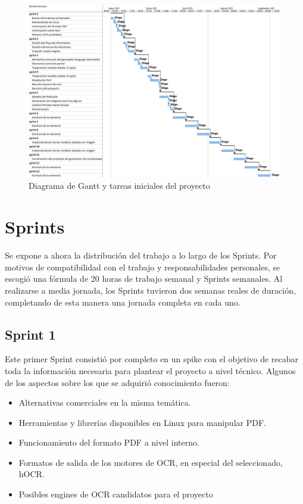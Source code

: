 \begin{figure}[hp!]
    \centering
    \includegraphics[angle=90,width=1.0\textwidth]{imaxes/f-planificacion/gantt-inicial.png}
    \caption{Diagrama de Gantt y tareas iniciales del proyecto}
    \label{fig:gantt-inicial}
\end{figure}

\section{Sprints}

Se expone a ahora la distribución del trabajo a lo largo de los Sprints. Por motivos de compatibilidad con el trabajo y responsabilidades personales, se escogió una fórmula de 20 horas de trabajo semanal y Sprints semanales. Al realizarse a media jornada, los Sprints tuvieron dos semanas reales de duración, completando de esta manera una jornada completa en cada uno.

\subsection{Sprint 1}

Este primer Sprint consistió por completo en un spike con el objetivo de recabar toda la información necesaria para plantear el proyecto a nivel técnico. Algunos de los aspectos sobre los que se adquirió conocimiento fueron:

\begin{itemize}
    \item Alternativas comerciales en la misma temática.
    \item Herramientas y librerías disponibles en Linux para manipular PDF.
    \item Funcionamiento del formato PDF a nivel interno.
    \item Formatos de salida de los motores de OCR, en especial del seleccionado, hOCR.
    \item Posibles engines de OCR candidatos para el proyecto
\end{itemize}

